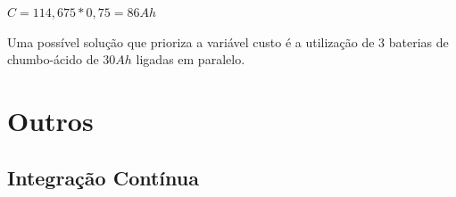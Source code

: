 $C=114,675 *0,75=86 Ah$

Uma possível solução que prioriza a variável custo é a utilização de $3$ baterias
de chumbo-ácido de $30 Ah$ ligadas em paralelo.



\section{Outros}

\subsection{Integração Contínua}
